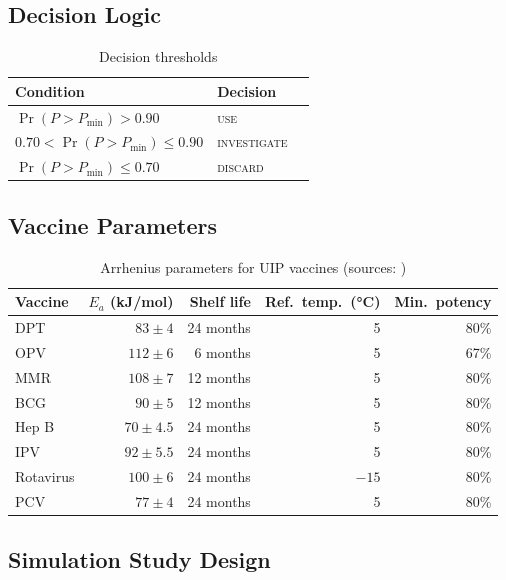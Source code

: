 \documentclass[12pt,a4paper]{article}
\begin{document}
\subsection{Decision Logic}

\begin{table}[H]
  \centering
  \caption{Decision thresholds}
  \begin{tabular}{lll}
    \toprule
    Condition & Decision \\
    \midrule
    $\Pr(P > P_\text{min}) > 0.90$ & \textsc{use} \\
    $0.70 < \Pr(P > P_\text{min}) \leq 0.90$ & \textsc{investigate} \\
    $\Pr(P > P_\text{min}) \leq 0.70$ & \textsc{discard} \\
    \bottomrule
  \end{tabular}
  \label{tab:decision}
\end{table}

\subsection{Vaccine Parameters}

\begin{table}[H]
  \centering
  \caption{Arrhenius parameters for UIP vaccines (sources: \citealt{galazka1998thermostability,who2006temperature})}
  \begin{tabular}{lrrrr}
    \toprule
    Vaccine & $E_a$ (kJ/mol) & Shelf life & Ref.\ temp.\ (°C) & Min.\ potency \\
    \midrule
    DPT       & $83 \pm 4$   & 24 months & 5  & 80\% \\
    OPV       & $112 \pm 6$  & 6 months  & 5  & 67\% \\
    MMR       & $108 \pm 7$  & 12 months & 5  & 80\% \\
    BCG       & $90 \pm 5$   & 12 months & 5  & 80\% \\
    Hep B     & $70 \pm 4.5$ & 24 months & 5  & 80\% \\
    IPV       & $92 \pm 5.5$ & 24 months & 5  & 80\% \\
    Rotavirus & $100 \pm 6$  & 24 months & $-15$ & 80\% \\
    PCV       & $77 \pm 4$   & 24 months & 5  & 80\% \\
    \bottomrule
  \end{tabular}
  \label{tab:params}
\end{table}

\subsection{Simulation Study Design}
\end{document}
